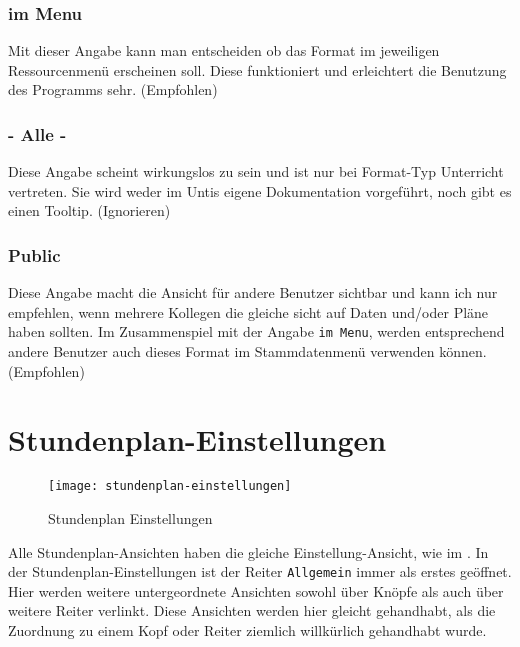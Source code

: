 \subsubsection{im Menu}
Mit dieser Angabe kann man entscheiden ob das Format im jeweiligen Ressourcenmenü erscheinen soll. Diese funktioniert und erleichtert die Benutzung des Programms sehr. (Empfohlen)

\subsubsection{- Alle -}
Diese Angabe scheint wirkungslos zu sein und ist nur bei Format-Typ Unterricht vertreten. Sie wird weder im Untis eigene Dokumentation vorgeführt, noch gibt es einen Tooltip. (Ignorieren)

\subsubsection{Public}
Diese Angabe macht die Ansicht für andere Benutzer sichtbar und kann ich nur empfehlen, wenn mehrere Kollegen die gleiche sicht auf Daten und/oder Pläne haben sollten. Im Zusammenspiel mit der Angabe \texttt{im Menu}, werden entsprechend andere Benutzer auch dieses Format im Stammdatenmenü verwenden können. (Empfohlen)

\section{Stundenplan-Einstellungen}
\label{sec:stundenplan-einstellungen}

\begin{wrapfigure}{r}{0.4\textwidth}
	\vspace{-14pt}
	\centering
	\texttt{[image: stundenplan-einstellungen]}
	\vspace{-5pt}
	\caption{Stundenplan Einstellungen}
	\label{fig:stundenplan-einstellungen}
	\vspace{-50pt}
\end{wrapfigure}

Alle Stundenplan-Ansichten haben die gleiche Einstellung-Ansicht, wie im . In der Stundenplan-Einstellungen ist der Reiter \texttt{Allgemein} immer als erstes geöffnet. Hier werden weitere untergeordnete Ansichten sowohl über Knöpfe als auch über weitere Reiter verlinkt. Diese Ansichten werden hier gleicht gehandhabt, als die Zuordnung zu einem Kopf oder Reiter ziemlich willkürlich gehandhabt wurde.\\

